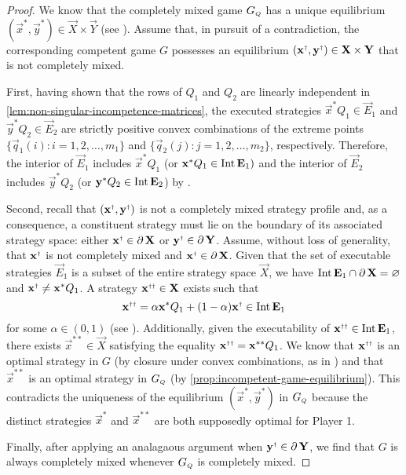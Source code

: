     \begin{proof}
        We know that the completely mixed game $G_\ms{Q}$ has a unique equilibrium $(\vec{x}^*, \vec{y}^*) \in \vec{X} \times \vec{Y}$ (see \parencite[Theorem 2]{Kaplansky1945}).
        Assume that, in pursuit of a contradiction, the corresponding competent game $G$ possesses an equilibrium $(\vec{x}^\sdagger, \vec{y}^\sdagger) \in \vec{X} \times \vec{Y}$ that is not completely mixed.

        First, having shown that the rows of $Q_1$ and $Q_2$ are linearly independent in \autoref{lem:non-singular-incompetence-matrices}, the executed strategies $\vec{x}^* Q_1 \in \vec{E}_1$  and $\vec{y}^* Q_2 \in \vec{E}_2$ are strictly positive convex combinations of the extreme points $\{\vec{q}_1(i) : i = 1, 2, \ldots, m_1\}$ and $\{\vec{q}_2(j) : j = 1, 2, \ldots, m_2\}$, respectively.
        Therefore, the interior of $\vec{E}_1$ includes $\vec{x}^* Q_1$ (or $\mathbf{x}^* Q_1 \in \operatorname{Int} \mathbf{E}_1)$ and the interior of $\vec{E}_2$ includes $\vec{y}^* Q_2$ (or $\mathbf{y}^* Q_2 \in \operatorname{Int} \mathbf{E}_2$) by \parencite[Corollary 4.19]{Soltan2020}.

        Second, recall that $(\vec{x}^\sdagger, \vec{y}^\sdagger)$ is not a completely mixed strategy profile and, as a consequence, a constituent strategy must lie on the boundary of its associated strategy space: either $\vec{x}^\sdagger \in \Bnd \vec{X}$ or $\vec{y}^\sdagger \in \Bnd \vec{Y}$.
        Assume, without loss of generality, that $\vec{x}^\sdagger$ is not completely mixed and $\vec{x}^\sdagger \in \Bnd \vec{X}$.
        Given that the set of executable strategies $\vec{E}_1$ is a subset of the entire strategy space $\vec{X}$, we have $\operatorname{Int} \mathbf{E}_1 \cap \operatorname{\partial} \mathbf{X} = \varnothing$ and $\vec{x}^\sdagger \neq \vec{x}^* Q_1$.
        A strategy $\vec{x}^{\sdagger \sdagger} \in \vec{X}$ exists such that
        \begin{equation} \label{temp:completely-mixed-competent-game-1}
            \vec{x}^{\sdagger \sdagger}
                = \alpha \vec{x}^* Q_1 + (1 - \alpha) \vec{x}^\sdagger
                \in \Int \vec{E}_1
        \end{equation}
        for some $\alpha \in (0, 1)$ (see \parencite[Theorem 3.26]{Soltan2020}).
        Additionally, given the executability of $\vec{x}^{\sdagger \sdagger} \in \Int \vec{E}_1$, there exists $\vec{x}^{**} \in \vec{X}$ satisfying the equality $\vec{x}^{\sdagger \sdagger} = \vec{x}^{* *} Q_1$.
        We know that $\vec{x}^{\sdagger \sdagger}$ is an optimal strategy in $G$ (by closure under convex combinations, as in \parencite[Proposition G.5]{Filar1997}) and that $\vec{x}^{**}$ is an optimal strategy in $G_\ms{Q}$ (by \autoref{prop:incompetent-game-equilibrium}).
        This contradicts the uniqueness of the equilibrium $(\vec{x}^*, \vec{y}^*)$ in $G_\ms{Q}$ because the distinct strategies $\vec{x}^*$ and $\vec{x}^{**}$ are both supposedly optimal for Player 1.

        Finally, after applying an analagaous argument when $\vec{y}^\sdagger \in \Bnd \vec{Y}$, we find that $G$ is always completely mixed whenever $G_\ms{Q}$ is completely mixed.
    \end{proof}

